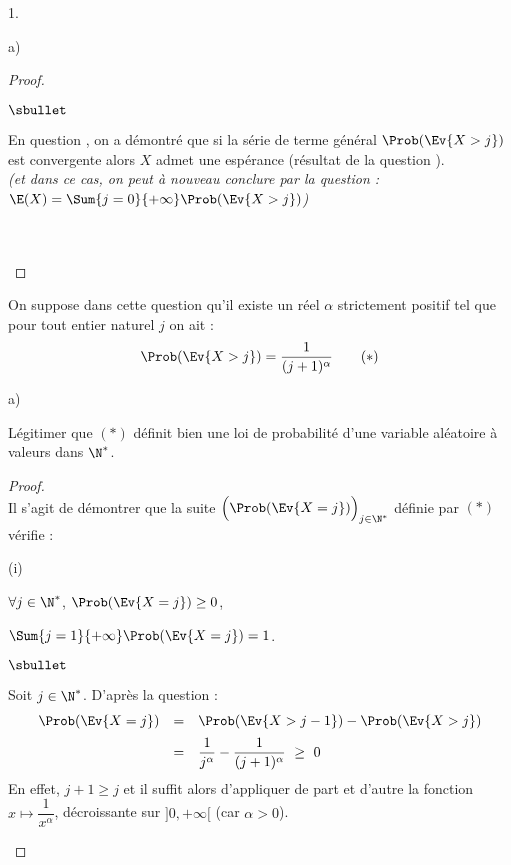 \documentclass[11pt]{article}%
\begin{document}
\begin{noliste}{1.}
\begin{noliste}{a)}
\begin{proof}
\begin{noliste}{$\sbullet$}
      \item En question , on a démontré que si la série de
        terme général $\Prob(\Ev{X > j})$ est convergente alors $X$
        admet une espérance (résultat de la question ).\\
        {\it (et dans ce cas, on peut à nouveau conclure par la
          question  : $\E(X) = \Sum{j=0}{+\infty}
          \Prob(\Ev{X > j})$)}
      \end{noliste}~\\[-1.2cm]
      ~\\[-.8cm]
    \end{proof}
%     
  \end{noliste}

\item On suppose dans cette question qu'il existe un réel $\alpha$
  strictement positif tel que pour tout entier naturel $j$ on ait :
  \[
  \Prob(\Ev{X >j})= \dfrac{1}{(j+1)^{\alpha}} \qquad (\ast)
  \]
  \begin{noliste}{a)}
  \item Légitimer que $(\ast)$ définit bien une loi de probabilité d'une 
    variable aléatoire à valeurs dans $\N^*$.
    
    \begin{proof}~\\%
      Il s'agit de démontrer que la suite $\Big( \Prob(\Ev{X = j})
      \Big)_{j \in \N^*}$ définie par $(\ast)$ vérifie :
      \begin{noliste}{(i)}
      \item $\forall j \in \N^*$, $\Prob(\Ev{X = j}) \geq 0$,
      \item $\Sum{j = 1}{+\infty} \Prob(\Ev{X = j}) = 1$.
      \end{noliste}
      \begin{noliste}{$\sbullet$}
      \item Soit $j \in \N^*$. D'après la question  :
        \[
        \begin{array}{rcl}
          \Prob(\Ev{X = j}) & = & \Prob(\Ev{X > j-1}) - \Prob(\Ev{X >
            j})
          \\[.2cm]
          & = & \dfrac{1}{j^{\alpha}} - \dfrac{1}{(j+1)^{\alpha}} \
          \geq \ 0
        \end{array}
        \]
        En effet, $j + 1 \geq j$ et il suffit alors d'appliquer de
        part et d'autre la fonction $x \mapsto \dfrac{1}{x^\alpha}$,
        décroissante sur $]0, +\infty[$ (car $\alpha > 0$).



\end{noliste}
\end{proof}
\end{noliste}
\end{noliste}
\end{document}
